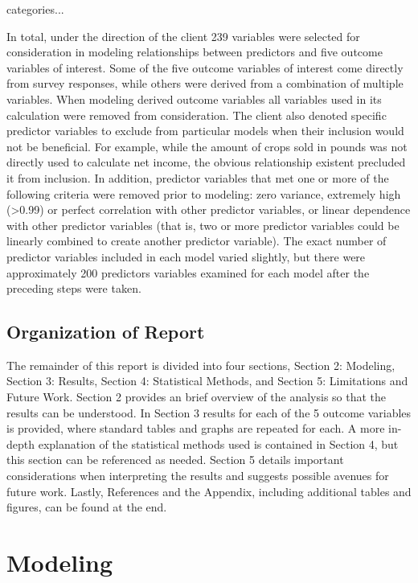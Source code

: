 \documentclass{article}
\begin{document}
categories...

In total, under the direction of the client 239 variables were selected for consideration in modeling 
relationships between predictors and five outcome variables of interest. Some of the five outcome variables of interest come 
directly from survey responses, while others were derived from a combination of multiple variables. When modeling derived 
outcome variables all variables used in its calculation were removed from consideration. The client also denoted specific 
predictor variables to exclude from particular models when their inclusion would not be beneficial. For example, while the 
amount of crops sold in pounds was not directly used to calculate net income, the obvious relationship existent precluded it 
from inclusion. In addition, predictor variables that met one or more of the following criteria were removed prior to modeling: 
zero variance, extremely high (>0.99) or perfect correlation with other predictor variables, or linear dependence with other 
predictor variables (that is, two or more predictor variables could be linearly combined to create another predictor variable). The 
exact number of predictor variables included in each model varied slightly, but there were approximately 200 predictors variables examined for each model after the preceding steps were taken.

\subsection{Organization of Report}

The remainder of this report is divided into four sections, Section 2: Modeling, Section 3: Results, Section 4: Statistical 
Methods, and Section 5: Limitations and Future Work. Section 2 provides an brief overview of the analysis so that the results can be understood. In Section 3 results for each of the 5 outcome variables is provided, where standard tables and graphs are repeated for each. A more in-depth explanation of the statistical methods used is contained in Section 4, but this section can be referenced as needed. Section 5 details important considerations when interpreting the results and suggests possible avenues for future work. Lastly, References and the Appendix, including additional tables and figures, can be found at the end.

\section{Modeling}
\end{document}
